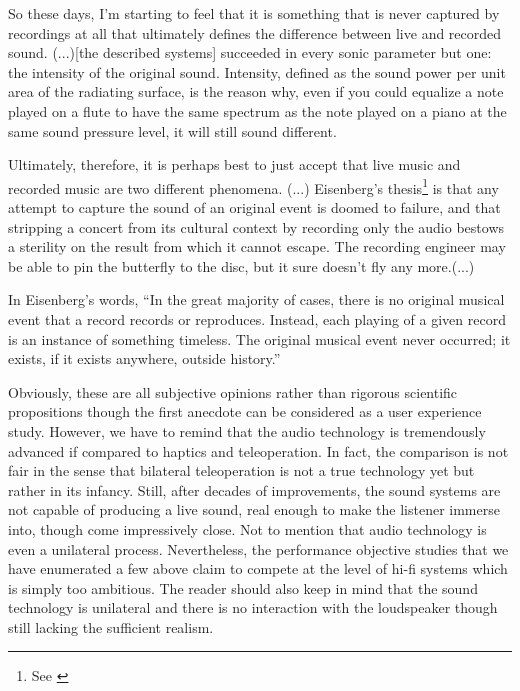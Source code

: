 \begin{displayquote}
So these days, I'm starting to feel that it is something that is never captured by recordings at all that ultimately defines the 
difference between live and recorded sound. (...)[the described systems] succeeded in 
every sonic parameter but one: the intensity of the original sound. Intensity, defined as the sound power per unit area of the 
radiating surface, is the reason why, even if you could equalize a note played on a flute to have the same spectrum as the note 
played on a piano at the same sound pressure level, it will still sound different.

Ultimately, therefore, it is perhaps best to just accept that live music and recorded music are two different phenomena. (...)
Eisenberg's thesis\footnote{See \cite{eisenberg}} is that any attempt to capture the sound of an original event is doomed to 
failure, and that stripping a concert from its cultural context by recording only the audio bestows a sterility on the result 
from which it cannot escape. The recording engineer may be able to pin the butterfly to the disc, but it sure doesn't fly any 
more.(...)

In Eisenberg's words, \enquote{In the great majority of cases, there is no original musical event that a record records or reproduces. 
Instead, each playing of a given record is an instance of something timeless. The original musical event never occurred; it exists, if 
it exists anywhere, outside history.}
\end{displayquote} 



Obviously, these are all subjective opinions rather than rigorous scientific propositions though the first anecdote can be considered as
a user experience study. However, we have to remind that the audio technology is tremendously advanced if compared to haptics and 
teleoperation. In fact, the comparison is not fair in the sense that bilateral teleoperation is not a true technology yet but rather 
in its infancy. Still, after decades of improvements, the sound systems are not capable of producing a live sound, real enough to make 
the listener immerse into, though come impressively close. Not to mention that audio technology is even a unilateral process. Nevertheless, 
the performance objective studies that we have enumerated a few above claim to compete at the level of hi-fi systems which is simply too 
ambitious. The reader should also keep in mind that the sound technology is unilateral and there is no interaction with the loudspeaker 
though still lacking the sufficient realism. 

